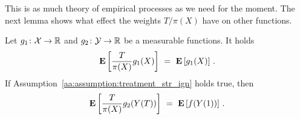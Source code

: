 This is as much theory of empirical processes as we need for the moment. The next lemma shows what effect the weights
$T/\pi(X)$ have on other functions.
\begin{lemma}
  \label{ps_weights_lemma}
  Let
  $
  g_1\colon
  \mathcal{X}\to\mathbb{R}
  $
  and
  $
  g_2\colon
  \mathcal{Y}\to\mathbb{R}
  $
  be a measurable functions.
  It holds
  \begin{gather*}
    \E
    \left[
    \frac{T}{\pi(X)}
    g_1(X)
    \right]
    \ 
    =
    \ 
    \E
    \left[
    g_1(X)
    \right]
    \,.
  \end{gather*}
  If Assumption~\ref{aa:assumption:treatment_str_ign} holds true, then
  \begin{gather*}
    \E
    \left[
    \frac{T}{\pi(X)}
    g_2(Y(T))
    \right]
    \ 
    =
    \ 
    \E
    \left[
    f(Y(1))
    \right]
    \,.
  \end{gather*}
\end{lemma}


